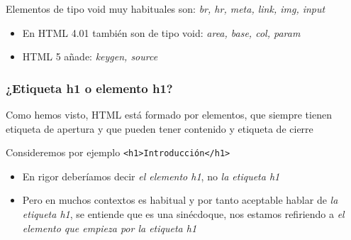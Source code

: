 \documentclass[ucs]{beamer}
\begin{document}
\begin{frame}[fragile]
\frametitle{}



Elementos de tipo void muy habituales son: \emph{br, hr, meta, link, img, input}

\begin{itemize}
\item
En HTML 4.01 también son de tipo void:  \emph{area, base, col, param}
\item
HTML 5 añade: \emph{ keygen,  source }
\end{itemize}






\end{frame}



\begin{frame}[fragile]
\frametitle{¿Etiqueta h1 o elemento h1?}

Como hemos visto, HTML está formado por elementos, que siempre tienen etiqueta
de apertura y que pueden tener contenido y etiqueta de cierre

Consideremos por ejemplo
\verb|<h1>Introducción</h1>|

\begin{itemize}
\item
En rigor deberíamos decir \emph{el elemento h1}, no \emph{la etiqueta h1}
\item
Pero en muchos contextos es habitual y por tanto aceptable hablar de \emph{la etiqueta h1},
se entiende que es una sinécdoque, nos estamos refiriendo a
\emph{el elemento que empieza por la etiqueta h1}
\end{itemize}

\end{frame}
\end{document}

